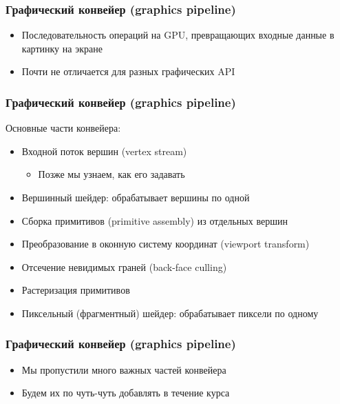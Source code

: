 \documentclass[10pt]{beamer}
\begin{document}
\begin{frame}[fragile]
\frametitle{Графический конвейер (graphics pipeline)}
\begin{itemize}
\item Последовательность операций на GPU, превращающих входные данные в картинку на экране
\pause
\item Почти не отличается для разных графических API
\end{itemize}
\end{frame}

\begin{frame}[fragile]
\frametitle{Графический конвейер (graphics pipeline)}
Основные части конвейера:
\begin{itemize}
\item Входной поток вершин (vertex stream)
\pause
\begin{itemize}
\item Позже мы узнаем, как его задавать
\end{itemize}
\pause
\item Вершинный шейдер: обрабатывает вершины по одной
\pause
\item Сборка примитивов (primitive assembly) из отдельных вершин
\pause
\item Преобразование в оконную систему координат (viewport transform)
\pause
\item Отсечение невидимых граней (back-face culling)
\pause
\item Растеризация примитивов
\pause
\item Пиксельный (фрагментный) шейдер: обрабатывает пиксели по одному
\end{itemize}
\end{frame}

\begin{frame}[fragile]
\frametitle{Графический конвейер (graphics pipeline)}
\begin{itemize}
\item Мы пропустили много важных частей конвейера
\item Будем их по чуть-чуть добавлять в течение курса
\end{itemize}
\end{frame}
\end{document}
